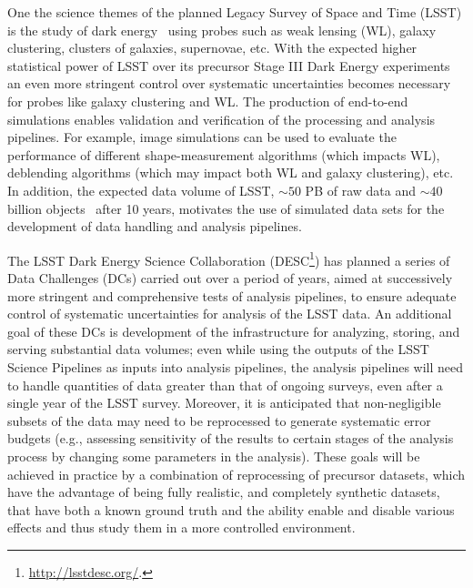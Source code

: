 \documentclass[a4paper,fleqn,usenatbib]{mnras}
\begin{document}
One the science themes of the planned Legacy Survey of Space and Time (LSST) is the study of dark energy~\citep{Overview} using probes such as weak lensing (WL), galaxy clustering, clusters of galaxies, supernovae, etc. With the expected higher statistical power of LSST over its precursor Stage III Dark Energy experiments~\citep{2006astro.ph..9591A} an even more stringent control over systematic uncertainties becomes necessary for probes like galaxy clustering and WL. The production of end-to-end simulations enables validation and verification of the processing and analysis pipelines. For example, image simulations can be used to evaluate the performance of different shape-measurement algorithms (which impacts WL), deblending algorithms (which may impact both WL and galaxy clustering), etc. In addition, the expected data volume of LSST, $\sim 50$ PB of raw data and $\sim 40$ billion objects~\citep{Overview} after 10 years, motivates the use of simulated data sets for the development of data handling and analysis pipelines.  

The LSST Dark Energy Science Collaboration
(DESC\footnote{\url{http://lsstdesc.org/}.}) has planned a series of
Data Challenges (DCs) carried out over a period of years, aimed at
successively more stringent and comprehensive tests of analysis
pipelines, to ensure adequate control of systematic uncertainties for
analysis of the LSST data.  An additional goal of these DCs is
development of the infrastructure for analyzing, storing, and serving
substantial data volumes; even while using the outputs of the LSST
Science Pipelines as inputs into analysis pipelines, the
analysis pipelines will need to handle quantities of data greater than that of 
ongoing surveys, even after a single year of the LSST survey. 
Moreover, it is anticipated that non-negligible subsets of
the data may need to be reprocessed to generate systematic error
budgets (e.g., assessing sensitivity of the results to certain stages
of the analysis process by changing some parameters in the
analysis). These goals will be achieved in practice by a combination
of reprocessing of precursor datasets, which have the advantage of
being fully realistic, and completely synthetic datasets, that have both a known ground 
truth and the ability enable and disable various effects and thus study them in a more controlled environment.
\end{document}
